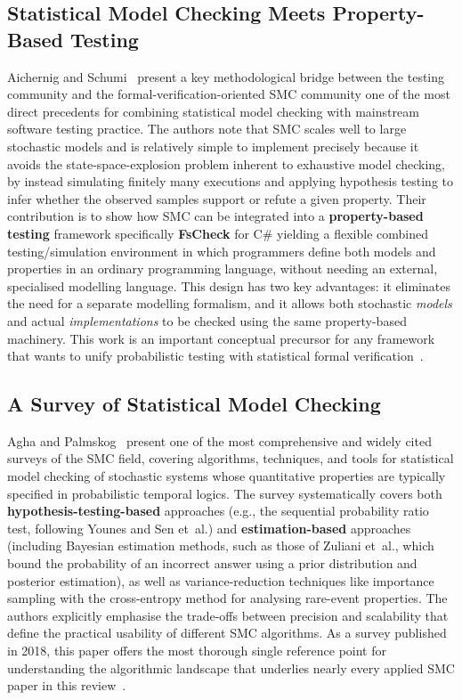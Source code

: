 \subsection{Statistical Model Checking Meets Property-Based Testing}
\label{sec:lr_aichernig}

Aichernig and Schumi~\cite{aichernig2017smc} present a key
methodological bridge between the testing community and the
formal-verification-oriented SMC community one of the most direct
precedents for combining statistical model checking with mainstream
software testing practice.  The authors note that SMC scales well to
large stochastic models and is relatively simple to implement precisely
because it avoids the state-space-explosion problem inherent to
exhaustive model checking, by instead simulating finitely many executions
and applying hypothesis testing to infer whether the observed samples
support or refute a given property.  Their contribution is to show how
SMC can be integrated into a \textbf{property-based testing}
framework specifically \textbf{FsCheck} for C\# yielding a flexible
combined testing/simulation environment in which programmers define both
models and properties in an ordinary programming language, without
needing an external, specialised modelling language.  This design has two
key advantages: it eliminates the need for a separate modelling
formalism, and it allows both stochastic \emph{models} and actual
\emph{implementations} to be checked using the same property-based
machinery.  This work is an important conceptual precursor for any
framework that wants to unify probabilistic testing with statistical
formal verification~\cite{camilli2021uncertainty}.

\subsection{A Survey of Statistical Model Checking}
\label{sec:lr_agha}

Agha and Palmskog~\cite{agha2018survey} present one of the most
comprehensive and widely cited surveys of the SMC field, covering
algorithms, techniques, and tools for statistical model checking of
stochastic systems whose quantitative properties are typically specified
in probabilistic temporal logics.  The survey systematically covers both
\textbf{hypothesis-testing-based} approaches (e.g., the sequential
probability ratio test, following Younes and Sen et~al.) and
\textbf{estimation-based} approaches (including Bayesian estimation
methods, such as those of Zuliani et~al., which bound the probability of
an incorrect answer using a prior distribution and posterior estimation),
as well as variance-reduction techniques like importance sampling with
the cross-entropy method for analysing rare-event properties.  The
authors explicitly emphasise the trade-offs between precision and
scalability that define the practical usability of different SMC
algorithms.  As a survey published in 2018, this paper offers the most
thorough single reference point for understanding the algorithmic
landscape that underlies nearly every applied SMC paper in this
review~\cite{shin2021pasta, budde2025sound, smc_processors2023,
soltani2023spare, aichernig2017smc}.

